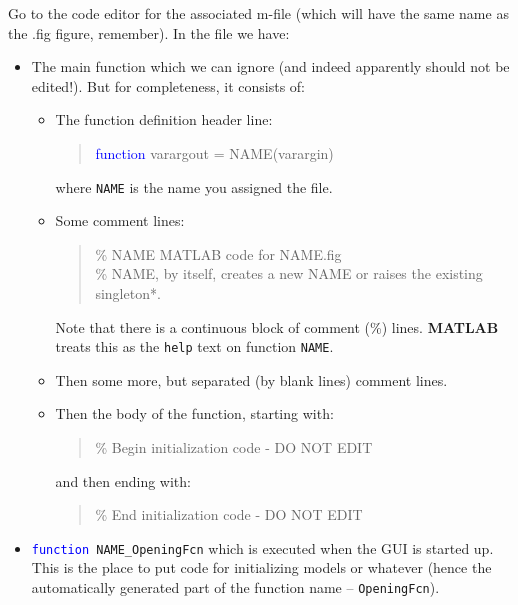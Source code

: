 \documentclass{tufte-book} %
\newenvironment{docspec}{\begin{quotation}\ttfamily\parskip0pt\parindent0pt\ignorespaces}{\end{quotation}}
\begin{document}
Go to the code editor for the associated \textsf{m-file} (which will have the same name as the \textsf{.fig} figure, remember). In the file we have:
\begin{itemize}
\setlength{\itemindent}{.2in}

\item The main function which we can ignore (and indeed apparently should not be edited!). But for completeness, it consists of:
\begin{itemize}[noitemsep]
\setlength{\itemindent}{.2in}
\item The function definition header line:
\begin{docspec}
\textcolor{blue}{function} varargout = NAME(varargin)
\end{docspec}
where \texttt{NAME} is the name you assigned the file.
\item Some comment lines:
\begin{docspec}
\textcolor[rgb]{0,0.501961,0}{\% NAME MATLAB code for NAME.fig\\
\%      NAME, by itself, creates a new NAME or raises the existing singleton*.}\\

\end{docspec}
Note that there is a continuous block of comment (\textcolor[rgb]{0,0.501961,0}{\%}) lines. \textbf{MATLAB} treats this as the \texttt{help} text on function \texttt{NAME}.
\item Then some more, but separated (by blank lines) comment lines.
\item Then the body of the function, starting with:
\begin{docspec}
\textcolor[rgb]{0,0.501961,0}{\% Begin initialization code - DO NOT EDIT}
\end{docspec}
and then ending with:
\begin{docspec}
\textcolor[rgb]{0,0.501961,0}{\% End initialization code - DO NOT EDIT}
\end{docspec}
\end{itemize}

\item \texttt{\textcolor{blue}{function} NAME\_OpeningFcn} which is executed when the GUI is started up. This is the place to put code for initializing models or whatever (hence the automatically generated part of the function name -- \texttt{OpeningFcn}).


\end{itemize}
\end{document}
